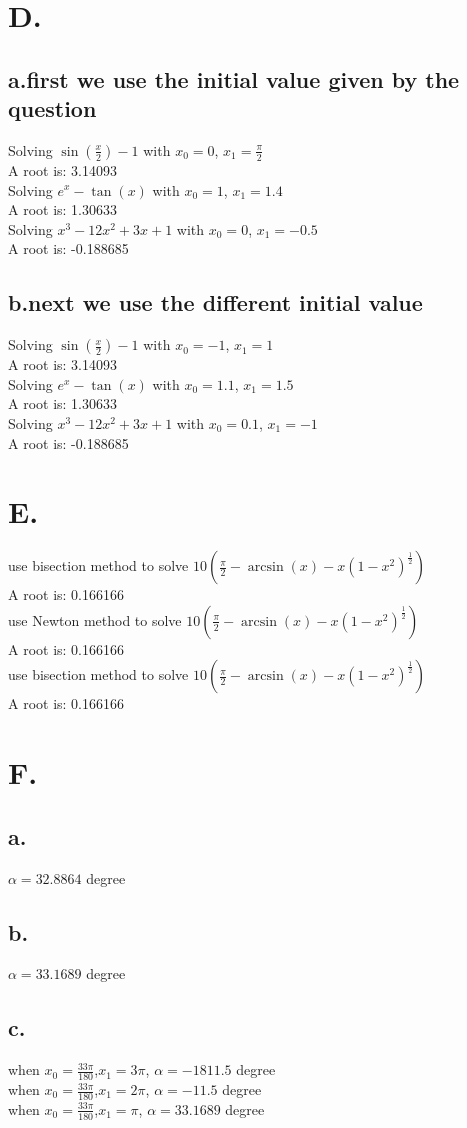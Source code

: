\documentclass[a4paper]{article}
\begin{document}
\section*{D.}
\subsection*{a.first we use the initial value given by the question}
Solving $\sin(\frac{x}{2})-1$ with $x_{0} = 0$, $x_{1} = \frac{\pi}{2}$\\
A root is: 3.14093\\
Solving $e^{x}-\tan(x)$ with $x_{0} = 1$, $x_{1} = 1.4$\\
A root is: 1.30633\\
Solving $x^{3}-12x^{2}+3x+1$ with $x_{0} = 0$, $x_{1} = -0.5$\\
A root is: -0.188685
\subsection*{b.next we use the different initial value}
Solving $\sin(\frac{x}{2})-1$ with $x_{0} = -1$, $x_{1} = 1$\\
A root is: 3.14093\\
Solving $e^{x}-\tan(x)$ with $x_{0} = 1.1$, $x_{1} = 1.5$\\
A root is: 1.30633\\
Solving $x^{3}-12x^{2}+3x+1$ with $x_{0} = 0.1$, $x_{1} = -1$\\
A root is: -0.188685

\section*{E.}
use bisection method to solve $10(\frac{\pi}{2}-\arcsin(x)-x(1-x^{2})^{\frac{1}{2}})$\\
A root is: 0.166166\\
use Newton method to solve $10(\frac{\pi}{2}-\arcsin(x)-x(1-x^{2})^{\frac{1}{2}})$\\
A root is: 0.166166\\
use bisection method to solve $10(\frac{\pi}{2}-\arcsin(x)-x(1-x^{2})^{\frac{1}{2}})$\\
A root is: 0.166166

\section*{F.}
\subsection*{a.}
$\alpha = 32.8864$ degree
\subsection*{b.}
$\alpha = 33.1689$ degree
\subsection*{c.}
when $x_{0}=\frac{33\pi}{180}$,$x_{1}=3\pi$, $\alpha = -1811.5$ degree\\
when $x_{0}=\frac{33\pi}{180}$,$x_{1}=2\pi$, $\alpha = -11.5$ degree\\
when $x_{0}=\frac{33\pi}{180}$,$x_{1}=\pi$, $\alpha = 33.1689$ degree
\end{document}
